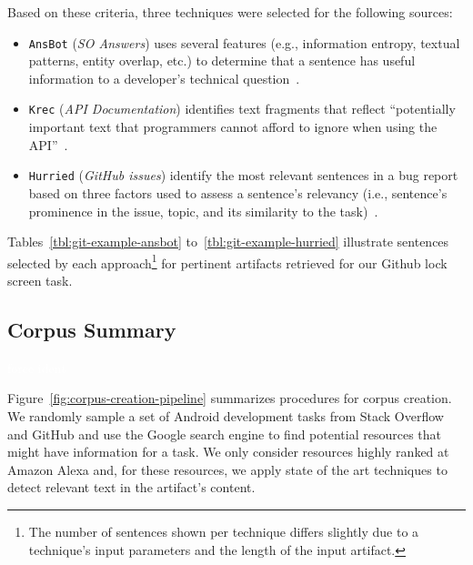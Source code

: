 Based on these criteria, three techniques were selected for the following sources:


\begin{itemize}[leftmargin=\parindent, font=\normalfont\itshape]
    \item \texttt{\acs{AnsBot}} (\textit{SO Answers}) uses several features (e.g., information entropy, textual patterns, entity overlap, etc.) to determine that a sentence has useful information to a developer's technical question~\cite{Xu2017}.
    
    \item \texttt{\acs{Krec}} (\textit{API Documentation}) identifies text fragments that reflect ``potentially important text that programmers cannot afford to ignore when using the API''~\cite{Robillard2015}.
    
    \item \texttt{\acs{Hurried}} (\textit{GitHub issues}) identify the most relevant sentences in a bug report based on three factors used to assess a sentence's relevancy (i.e., sentence's prominence in the issue, topic, and its similarity to the task)~\cite{Lotufo2012}.
\end{itemize}



Tables~\ref{tbl:git-example-ansbot} to~\ref{tbl:git-example-hurried}
illustrate sentences selected by each approach\footnote{The number of sentences shown per technique
differs slightly due to a technique's input parameters and the length of the input artifact.}
 for pertinent artifacts retrieved for our Github lock screen task. 










\subsection{Corpus Summary}
\textcolor{white}{force ident} %



Figure~\ref{fig:corpus-creation-pipeline} summarizes procedures for corpus creation.
We randomly sample a set of Android development tasks from Stack Overflow and GitHub
and use the Google search engine to find potential resources that might have
information for a task. We only consider resources highly ranked at Amazon Alexa and, for these resources, we apply state of the art techniques to detect relevant text in the artifact's content.



